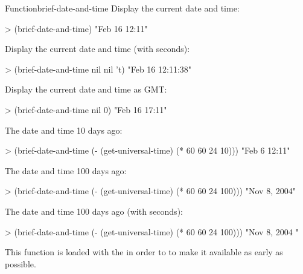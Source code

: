 \documentclass[10pt,twoside,english,pdftex]{article}
\begin{document}
\begin{functiondoc}{Function}{brief-date-and-time}{%
     
    \returns{} }
\fnexamples
Display the current date and time: 
%
\W\supp
\begin{example}
> (brief-date-and-time)
"Feb 16 12:11"
\end{example}
%
Display the current date and time (with seconds):
%
\W\supp\notpretop
\begin{example}
> (brief-date-and-time nil nil 't)
"Feb 16 12:11:38"
\end{example}
%
Display the current date and time as GMT: 
%
\W\supp\notpretop
\begin{example}
> (brief-date-and-time nil 0)
"Feb 16 17:11"
\end{example}
%
The date and time 10 days ago:
%
\W\supp\notpretop
\begin{example}
> (brief-date-and-time (- (get-universal-time) (* 60 60 24 10)))
"Feb 6 12:11"
\end{example}
%
The date and time 100 days ago:
%
\W\supp\notpretop
\begin{example}
> (brief-date-and-time (- (get-universal-time) (* 60 60 24 100)))
"Nov  8, 2004"
\end{example}
%
The date and time 100 days ago (with seconds):
%
\W\supp\notpretop
\begin{example}
> (brief-date-and-time (- (get-universal-time) (* 60 60 24 100)))
"Nov  8, 2004   "
\end{example}

\fnnote
{}%
%
%
This function is loaded with the   in order
to to make it available as early as possible.

\end{functiondoc}

\end{document}
